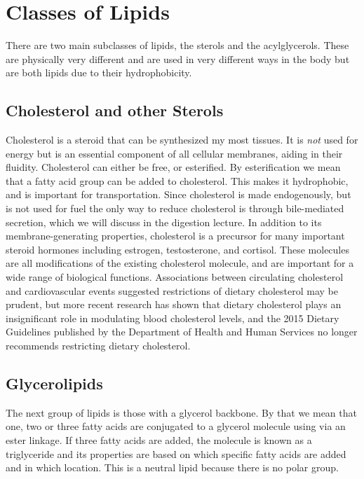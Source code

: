 \documentclass{tufte-handout}
\begin{document}
\section{Classes of Lipids}

There are two main subclasses of lipids, the sterols and the acylglycerols.  These are physically very different and are used in very different ways in the body but are both lipids due to their hydrophobicity.

\subsection{Cholesterol and other Sterols}

Cholesterol is a steroid that can be synthesized my most tissues.  It is \emph{not} used for energy but is an essential component of all cellular membranes, aiding in their fluidity.  Cholesterol can either be free, or esterified.  By esterification we mean that a fatty acid group can be added to cholesterol.  This makes it hydrophobic, and is important for transportation.  Since cholesterol is made endogenously, but is not used for fuel the only way to reduce cholesterol is through bile-mediated secretion, which we will discuss in the digestion lecture.  In addition to its membrane-generating properties, cholesterol is a precursor for many important steroid hormones including estrogen, testosterone, and cortisol.  These molecules are all modifications of the existing cholesterol molecule, and are important for a wide range of biological functions.  Associations between circulating cholesterol and cardiovascular events suggested restrictions of dietary cholesterol may be prudent, but more recent research has shown that dietary cholesterol plays an insignificant role in modulating blood cholesterol levels, and the 2015 Dietary Guidelines published by the Department of Health and Human Services no longer recommends restricting dietary cholesterol\cite{USDA2015}.

\subsection{Glycerolipids}

The next group of lipids is those with a glycerol backbone.  By that we mean that one, two or three fatty acids are conjugated to a glycerol molecule using via an ester linkage.  If three fatty acids are added, the molecule is known as a triglyceride and its properties are based on which specific fatty acids are added and in which location.  This is a neutral lipid because there is no polar group.
\end{document}
